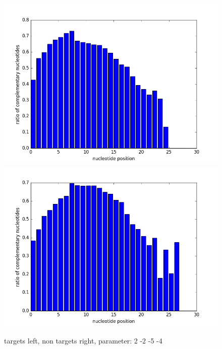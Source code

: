 \documentclass[12pt]{article}
\begin{document}
\begin{figure}
\includegraphics[scale=0.2]{results/ratio2-2-5-4.png}
\includegraphics[scale=0.2]{results/non-ratio2-2-5-4.png}
\caption {targets left, non targets right, parameter: 2 -2 -5 -4}
\label{fig:plot3}
\end{figure}
\end{document}
